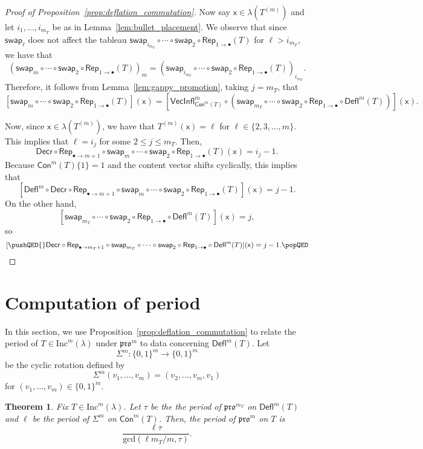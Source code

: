 \documentclass[12pt]{amsart}
\newcommand{\x}{\ensuremath{\mathsf{x}}}
\newtheorem{theorem}{Theorem}[section]
\theoremstyle{definition}
\theoremstyle{remark}
\numberwithin{equation}{section}
\newcommand{\inc}{\ensuremath{\mathrm{Inc}}}
\newcommand{\pro}{\mathfrak{pro}}
\newcommand{\swap}{\ensuremath{\mathsf{swap}}}
\newcommand{\decr}{\ensuremath{\mathsf{Decr}}}
\newcommand{\rep}{\ensuremath{\mathsf{Rep}}}
\newcommand{\deflate}{\ensuremath{\mathsf{Defl}}}
\newcommand{\inflate}{\ensuremath{\mathsf{VecInfl}}}
\newcommand{\content}{\ensuremath{\mathsf{Con}}}
\begin{document}
\begin{proof}[Proof of Proposition~\ref{prop:deflation_commutation}]
Now say $\x \in \lambda(T^{(m)})$ and let $i_1, \ldots, i_{m_T}$ be as in Lemma~\ref{lem:bullet_placement}. We observe that since $\swap_\ell$ does not affect the tableau $\swap_{i_{m_T}} \circ \cdots \circ \swap_2 \circ \rep_{1 \rightarrow \bullet} (T)$ for $\ell > i_{m_T}$, we have that
\[ (\swap_m \circ \cdots \circ \swap_2 \circ \rep_{1 \rightarrow \bullet}( T ))_m = (\swap_{i_{m_T}} \circ \cdots \circ \swap_2 \circ \rep_{1 \rightarrow \bullet}( T ))_{i_{m_T}}.  \]
Therefore, it follows from Lemma~\ref{lem:gappy_promotion}, taking $j = m_T$, that 
\[ [\swap_m \circ \cdots \circ \swap_2 \circ \rep_{1 \rightarrow \bullet}( T )](\x) = [\inflate^m_{\content^m(T)} \circ (\swap_{m_T} \circ \cdots \circ   \swap_2  \circ \rep_{1 \rightarrow \bullet} \circ \deflate^m(T))](\x). \]

Now, since $\x \in \lambda(T^{(m)})$, we have that $T^{(m)}(\x) = \ell$ for $\ell \in \{2,3,\dots,m\}$. This implies that $\ell = i_j$ for some $2 \leq j \leq m_T$. Then, 
\[
\decr \circ \rep_{\bullet \to m+1} \circ \swap_m \circ \cdots \circ \swap_2 \circ \rep_{1 \rightarrow \bullet} (T)(\x) = i_j-1.
\]
Because $\content^m(T) \lbrace 1 \rbrace = 1$ and the content vector shifts cyclically, this implies that 
 \[
 [\deflate^m \circ \decr \circ \rep_{\bullet \rightarrow m+1} \circ \swap_m \circ \cdots \circ \swap_2 \circ \rep_{1 \rightarrow \bullet} (T)](\x) = j-1.
 \]
  On the other hand, 
  \[
  [\swap_{m_T} \circ \cdots \circ \swap_2 \circ \rep_{1 \rightarrow \bullet} \circ \deflate^m(T)](\x) = j,
  \]
   so 
   \[
   [ \pushQED{\qed} \decr \circ \rep_{\bullet \rightarrow m_T + 1} \circ \swap_{m_T} \circ \cdots \circ \swap_2 \circ \rep_{1 \rightarrow \bullet} \circ  \deflate^m(T)](\x) = j-1. \qedhere \popQED \] \let\qed\relax
\end{proof}

\section{Computation of period}\label{sec:period} In this section, we use Proposition~\ref{prop:deflation_commutation} to relate the period of $T \in \inc^m(\lambda)$ under $\pro^m$ to data concerning $\deflate^m(T)$. Let 
\[\Sigma^m : \lbrace 0,1\rbrace^m \rightarrow \lbrace 0,1\rbrace^m\]
 be the cyclic rotation defined by 
 \[
 \Sigma^m(v_1, \dots, v_m) = (v_2, \dots, v_m, v_1)
 \]
  for $(v_1, \dots, v_m) \in \lbrace 0,1 \rbrace^m$. 
  
\begin{theorem}\label{thm:periodthm}
Fix $T \in \inc^m(\lambda)$. Let $\tau$ be the the period of $\pro^{m_T}$ on $\deflate^m(T)$ and $\ell$ be the period of $\Sigma^m$ on $\content^m(T)$. Then, the period of $\pro^m$ on $T$ is \[\frac{\ell  \tau}{\mathrm{gcd}(\ell m_T / m,\tau)}. \]
\end{theorem} 
    
\end{document}
